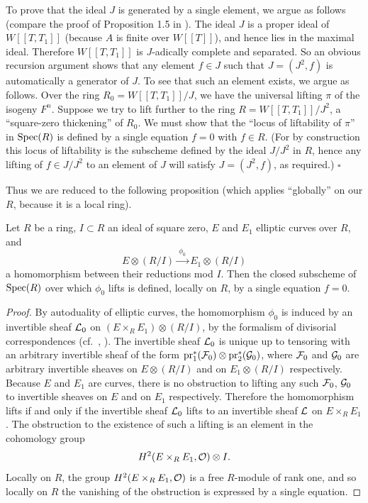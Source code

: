 To prove that the ideal $J$ is generated by a single element, we argue as follows (compare the proof of Proposition 1.5 in \cite{DeIl}). The ideal $J$ is a proper ideal of $W[[T,T_1]]$ (because $A$ is finite over $W[[T]]$), and hence lies in the maximal ideal. Therefore $W[[T,T_1]]$ is $J$-adically complete and separated. So an obvious recursion argument shows that any element $f \in J$ such that $J = (J^2, f)$ is automatically a generator of $J$. To see that such an element exists, we argue as follows. Over the ring $R_0 = W[[T,T_1]]/J$, we have the universal lifting $\pi$ of the isogeny $F^n$. Suppose we try to lift further to the ring $R = W[[T,T_1]]/J^2$, a ``square-zero thickening'' of $R_0$. We must show that the ``locus of liftability of $\pi$'' in $\operatorname{Spec}(R)$ is defined by a single equation $f = 0$ with $f \in R$. (For by construction this locus of liftability is the subscheme defined by the ideal $J/J^2$ in $R$, hence any lifting of $f \in J/J^2$ to an element of $J$ will satisfy $J = (J^2, f)$, as required.) \hfill\ensuremath{\square}

Thus we are reduced to the following proposition (which applies ``globally'' on our $R$, because it is a local ring).

\begin{kprop}\label{prop:6.8.6}
Let $R$ be a ring, $I \subset R$ an ideal of square zero, $E$ and $E_1$ elliptic curves over $R$, and
\[
E \otimes (R/I) \xrightarrow{\ \phi_0\ } E_1 \otimes (R/I)
\]
a homomorphism between their reductions mod $I$. Then the closed subscheme of $\operatorname{Spec}(R)$ over which $\phi_0$ lifts is defined, locally on $R$, by a single equation $f = 0$.
\end{kprop}

\begin{proof}
By autoduality of elliptic curves, the homomorphism $\phi_0$ is induced by an invertible sheaf $\mathcal{L}_0$ on $(E \times_R E_1) \otimes (R/I)$, by the formalism of divisorial correspondences (cf.\ \cite[Exp.~VII, \S2]{DeGiRay}, \cite[7, VIII 3.2.4 and VII 2.9.5]{SGA}). The invertible sheaf $\mathcal{L}_0$ is unique up to tensoring with an arbitrary invertible sheaf of the form $\mathrm{pr}_1^*(\mathcal{F}_0) \otimes \mathrm{pr}_2^*(\mathcal{G}_0)$, where $\mathcal{F}_0$ and $\mathcal{G}_0$ are arbitrary invertible sheaves on $E \otimes (R/I)$ and on $E_1 \otimes (R/I)$ respectively. Because $E$ and $E_1$ are curves, there is no obstruction to lifting any such $\mathcal{F}_0$, $\mathcal{G}_0$ to invertible sheaves on $E$ and on $E_1$ respectively. Therefore the homomorphism lifts if and only if the invertible sheaf $\mathcal{L}_0$ lifts to an invertible sheaf $\mathcal{L}$ on $E \times_R E_1$. The obstruction to the existence of such a lifting is an element in the cohomology group
\[
H^2(E \times_R E_1, \mathcal{O}) \otimes I .
\]
Locally on $R$, the group $H^2(E \times_R E_1, \mathcal{O})$ is a free $R$-module of rank one, and so locally on $R$ the vanishing of the obstruction is expressed by a single equation.
\end{proof}

